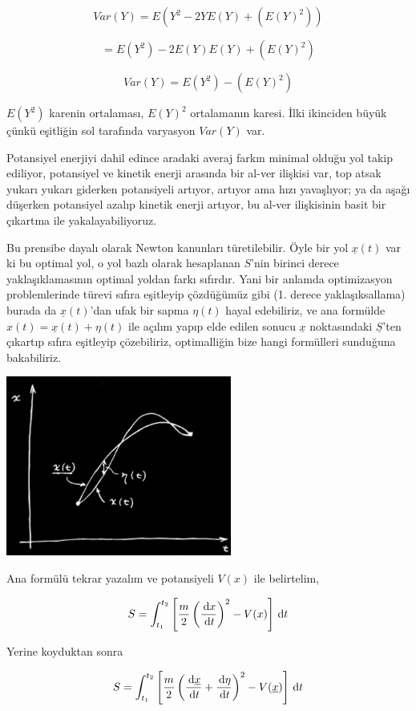\documentclass[12pt,fleqn]{article}\usepackage{../../common}
\begin{document}
$$ Var(Y) = E( Y^2  - 2YE(Y) + (E(Y)^2) )$$

$$  = E(Y^2)  - 2E(Y)E(Y) + (E(Y)^2)$$

$$ Var(Y) = E(Y^2) - (E(Y)^2)$$

$E(Y^2)$ karenin ortalaması, $E(Y)^2$ ortalamanın karesi. İlki ikinciden
büyük çünkü eşitliğin sol tarafında varyasyon $Var(Y)$ var. 

Potansiyel enerjiyi dahil edince aradaki averaj farkın minimal olduğu yol
takip ediliyor, potansiyel ve kinetik enerji arasında bir al-ver ilişkisi
var, top atsak yukarı yukarı giderken potansiyeli artıyor, artıyor ama hızı
yavaşlıyor; ya da aşağı düşerken potansiyel azalıp kinetik enerji artıyor,
bu al-ver ilişkisinin basit bir çıkartma ile yakalayabiliyoruz. 

Bu prensibe dayalı olarak Newton kanunları türetilebilir. Öyle bir yol
$\underline{x}(t)$ var ki bu optimal yol, o yol bazlı olarak hesaplanan
$S$'nin birinci derece yaklaşıklamasının optimal yoldan farkı
sıfırdır. Yani bir anlamda optimizasyon problemlerinde türevi sıfıra
eşitleyip çözdüğümüz gibi (1. derece yaklaşıksallama) burada da
$\underline{x}(t)$'dan ufak bir sapma $\eta(t)$ hayal edebiliriz, ve ana
formülde $x(t) = \underline{x}(t) + \eta(t)$ ile açılım yapıp elde edilen
sonucu $\underline{x}$ noktasındaki $\underline{S}$'ten çıkartıp sıfıra
eşitleyip çözebiliriz, optimalliğin bize hangi formülleri sunduğuna
bakabiliriz. 

\includegraphics[width=20em]{phy_lagrange_05.png}

Ana formülü tekrar yazalım ve potansiyeli $V(x)$ ile belirtelim,

$$ 
S = \int _{t_1}^{t_2} 
\left[ 
\frac{m}{2} \left( \frac{\,\mathrm{d} x}{\,\mathrm{d} t} \right)^2 - V(x)
\right] \,\mathrm{d} t
$$

Yerine koyduktan sonra

$$ 
S = \int _{t_1}^{t_2} 
\left[ 
  \frac{m}{2} 
   \left(  \frac{\,\mathrm{d} \underline{x}}{\,\mathrm{d} t} + \frac{\,\mathrm{d} \eta}{\,\mathrm{d} t} \right)^2 - 
   V(\underline{x})
\right] \,\mathrm{d} t
$$
\end{document}
